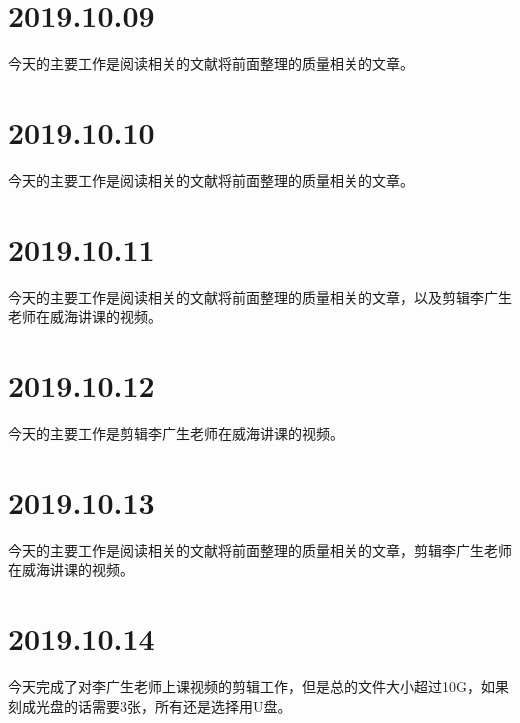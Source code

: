 \section{2019.10.09}
今天的主要工作是阅读相关的文献将前面整理的质量相关的文章。

\section{2019.10.10}
今天的主要工作是阅读相关的文献将前面整理的质量相关的文章。

\section{2019.10.11}
今天的主要工作是阅读相关的文献将前面整理的质量相关的文章，以及剪辑李广生老师在威海讲课的视频。

\section{2019.10.12}
今天的主要工作是剪辑李广生老师在威海讲课的视频。

\section{2019.10.13}
今天的主要工作是阅读相关的文献将前面整理的质量相关的文章，剪辑李广生老师在威海讲课的视频。

\section{2019.10.14}
今天完成了对李广生老师上课视频的剪辑工作，但是总的文件大小超过10G，如果刻成光盘的话需要3张，所有还是选择用U盘。